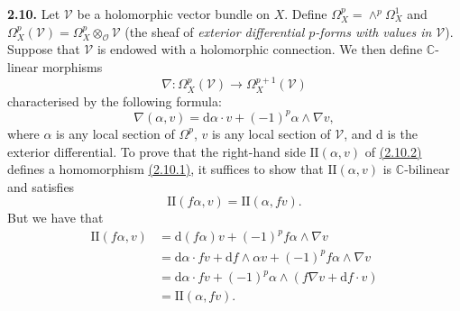 \documentclass{report}
\newenvironment{rmenv}[1]
  {\phantomsection\par\medskip\noindent\textbf{#1.}\rmfamily}
  {\medskip}
\newcommand{\scr}[1]{{\mathscr{#1}}}
\renewcommand{\cal}[1]{{\mathcal{#1}}}
\newcommand{\CC}{\mathbb{C}}
\newcommand{\dd}{\mathrm{d}}
\newcommand{\II}{\mathrm{II}}
\begin{document}
\begin{rmenv}{2.10}
\label{I.2.10}
  Let $\scr{V}$ be a holomorphic vector bundle on $X$.
  Define $\Omega_X^p=\wedge^p\Omega_X^1$ and $\Omega_X^p(\scr{V})=\Omega_X^p\otimes_\cal{O}\scr{V}$ (the sheaf of \emph{exterior differential $p$-forms with values in $\scr{V}$}).
  Suppose that $\scr{V}$ is endowed with a holomorphic connection.
  We then define $\CC$-linear morphisms
  \[
  \label{I.2.10.1}
    \nabla\colon \Omega_X^p(\scr{V}) \to \Omega_X^{p+1}(\scr{V})
  \tag{2.10.1}
  \]
  characterised by the following formula:
  \[
  \label{I.2.10.2}
    \nabla(\alpha,v) = \dd\alpha\cdot v + (-1)^p\alpha\wedge\nabla v,
  \tag{2.10.2}
  \]
  where $\alpha$ is any local section of $\Omega^p$, $v$ is any local section of $\scr{V}$, and $\dd$ is the exterior differential.
  To prove that the right-hand side $\II(\alpha,v)$ of \hyperref[I.2.10.2]{(2.10.2)} defines a homomorphism \hyperref[I.2.10.1]{(2.10.1)}, it suffices to show that $\II(\alpha,v)$ is $\CC$-bilinear and satisfies
  \[
    \II(f\alpha,v) = \II(\alpha,fv).
  \]
  But we have that
  \[
    \begin{aligned}
      \II(f\alpha,v)
      &= \dd(f\alpha)v + (-1)^pf\alpha\wedge\nabla v
    \\&= \dd\alpha\cdot fv + \dd f\wedge\alpha v + (-1)^pf\alpha\wedge\nabla v
    \\&= \dd\alpha\cdot fv + (-1)^p\alpha\wedge(f\nabla v+\dd f\cdot v)
    \\&= \II(\alpha,fv).
    \end{aligned}
  \]


\end{rmenv}
\end{document}
